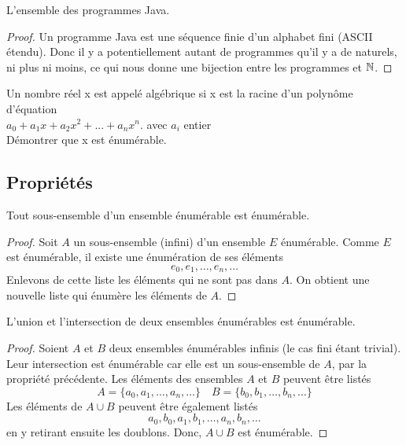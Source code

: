  \begin{myexem}
 \label{exem:programme_java}
  L'ensemble des programmes Java.
  \begin{proof}
   Un programme Java est une séquence finie d'un alphabet fini (ASCII étendu). Donc il y a potentiellement autant de programmes qu'il y a de naturels, ni plus ni moins, ce qui nous donne une bijection entre les programmes et $\mathbb{N}$.
  \end{proof}
\end{myexem}

\begin{myexercice} \label{exerc:ensembleEnumNumAlgebrique}
Un nombre réel x est appelé algébrique si x est la racine d'un polynôme d'équation\\
\indent $a_0 + a_1x + a_2x^2 + ... + a_nx^n$.  avec $a_i$ entier\\
Démontrer que x est énumérable.
\end{myexercice}

\subsection{Propriétés}
\label{subsec:proprietes}

\begin{myprop}
	Tout sous-ensemble d'un ensemble énumérable est énumérable.
	\begin{proof}
Soit $A$ un sous-ensemble (infini) d'un ensemble $E$ énumérable. Comme $E$ est énumérable, il existe une énumération de ses éléments
\[
e_0, e_1, \ldots , e_n, \ldots
\]
Enlevons de cette liste les éléments qui ne sont pas dans $A$. On obtient une nouvelle liste qui énumère les éléments de $A$.
	\end{proof}
\end{myprop}

\begin{myprop}
	L'union et l'intersection de deux ensembles énumérables est énumérable.
	\begin{proof}
		Soient $A$ et $B$ deux ensembles énumérables infinis (le cas fini étant trivial). Leur intersection est énumérable car elle est un sous-ensemble de $A$, par la propriété précédente. Les éléments des ensembles $A$ et $B$ peuvent être listés
\[
A = \{ a_0, a_1, \ldots , a_n, \ldots\}  \quad
B = \{ b_0, b_1, \ldots , b_n, \ldots\}
\]
Les éléments de $A \cup B$ peuvent être également listés
\[
a_0, b_0, a_1, b_1, \ldots, a_n, b_n, \ldots
\]
en y retirant ensuite les doublons. Donc, $A \cup B$ est énumérable.
	\end{proof}
\end{myprop}

